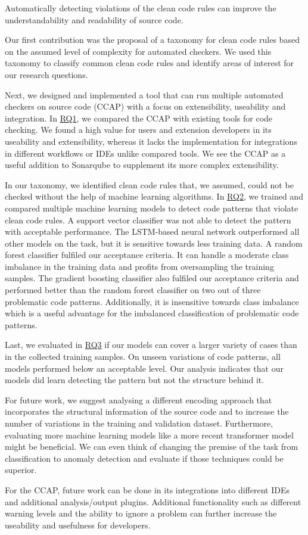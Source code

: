 

Automatically detecting violations of the clean code rules can improve the understandability and readability of source code. 

Our first contribution was the proposal of a taxonomy for clean code rules based on the assumed level of complexity for automated checkers.
We used this taxonomy to classify common clean code rules and identify areas of interest for our research questions.

Next, we designed and implemented a tool that can run multiple automated checkers on source code (CCAP) with a focus on extensibility, useability and integration. In \hyperref[rq:1]{RQ1}, we compared the CCAP with existing tools for code checking. We found a high value for users and extension developers in its useability and extensibility, whereas it lacks the implementation for integrations in different workflows or IDEs unlike compared tools. We see the CCAP as a useful addition to Sonarqube to supplement its more complex extensibility.

In our taxonomy, we identified clean code rules that, we assumed, could not be checked without the help of machine learning algorithms. In \hyperref[rq:2]{RQ2}, we trained and compared multiple machine learning models to detect code patterns that violate clean code rules. A support vector classifier was not able to detect the pattern with acceptable performance. The LSTM-based neural network outperformed all other models on the task, but it is sensitive towards less training data.
A random forest classifier fulfiled our acceptance criteria. It can handle a moderate class imbalance in the training data and profits from oversampling the training samples. The gradient boosting classifier also fulfiled our acceptance criteria and performed better than the random forest classifier on two out of three problematic code patterns. Additionally, it is insensitive towards class imbalance which is a useful advantage for the imbalanced classification of problematic code patterns.

Last, we evaluated in \hyperref[rq:3]{RQ3} if our models can cover a larger variety of cases than in the collected training samples. On unseen variations of code patterns, all models performed below an acceptable level. Our analysis indicates that our models did learn detecting the pattern but not the structure behind it.

\medskip
For future work, we suggest analysing a different encoding approach that incorporates the structural information of the source code and to increase the number of variations in the training and validation dataset. Furthermore, evaluating more machine learning models like a more recent transformer model might be beneficial. We can even think of changing the premise of the task from classification to anomaly detection and evaluate if those techniques could be superior.

For the CCAP, future work can be done in its integrations into different IDEs and additional analysis/output plugins. Additional functionality such as different warning levels and the ability to ignore a problem can further increase the useability and usefulness for developers.





